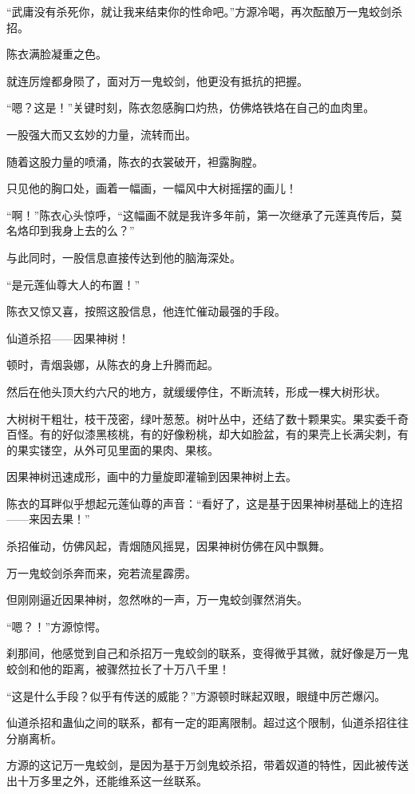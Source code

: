 \begin{this_body}
“武庸没有杀死你，就让我来结束你的性命吧。”方源冷喝，再次酝酿万一鬼蛟剑杀招。

陈衣满脸凝重之色。

就连厉煌都身陨了，面对万一鬼蛟剑，他更没有抵抗的把握。

“嗯？这是！”关键时刻，陈衣忽感胸口灼热，仿佛烙铁烙在自己的血肉里。

一股强大而又玄妙的力量，流转而出。

随着这股力量的喷涌，陈衣的衣裳破开，袒露胸膛。

只见他的胸口处，画着一幅画，一幅风中大树摇摆的画儿！

“啊！”陈衣心头惊呼，“这幅画不就是我许多年前，第一次继承了元莲真传后，莫名烙印到我身上去的么？”

与此同时，一股信息直接传达到他的脑海深处。

“是元莲仙尊大人的布置！”

陈衣又惊又喜，按照这股信息，他连忙催动最强的手段。

仙道杀招——因果神树！

顿时，青烟袅娜，从陈衣的身上升腾而起。

然后在他头顶大约六尺的地方，就缓缓停住，不断流转，形成一棵大树形状。

大树树干粗壮，枝干茂密，绿叶葱葱。树叶丛中，还结了数十颗果实。果实委千奇百怪。有的好似漆黑核桃，有的好像粉桃，却大如脸盆，有的果壳上长满尖刺，有的果实镂空，从外可见里面的果肉、果核。

因果神树迅速成形，画中的力量旋即灌输到因果神树上去。

陈衣的耳畔似乎想起元莲仙尊的声音：“看好了，这是基于因果神树基础上的连招——来因去果！”

杀招催动，仿佛风起，青烟随风摇晃，因果神树仿佛在风中飘舞。

万一鬼蛟剑杀奔而来，宛若流星霹雳。

但刚刚逼近因果神树，忽然咻的一声，万一鬼蛟剑骤然消失。

“嗯？！”方源惊愕。

刹那间，他感觉到自己和杀招万一鬼蛟剑的联系，变得微乎其微，就好像是万一鬼蛟剑和他的距离，被骤然拉长了十万八千里！

“这是什么手段？似乎有传送的威能？”方源顿时眯起双眼，眼缝中厉芒爆闪。

仙道杀招和蛊仙之间的联系，都有一定的距离限制。超过这个限制，仙道杀招往往分崩离析。

方源的这记万一鬼蛟剑，是因为基于万剑鬼蛟杀招，带着奴道的特性，因此被传送出十万多里之外，还能维系这一丝联系。


\end{this_body}
